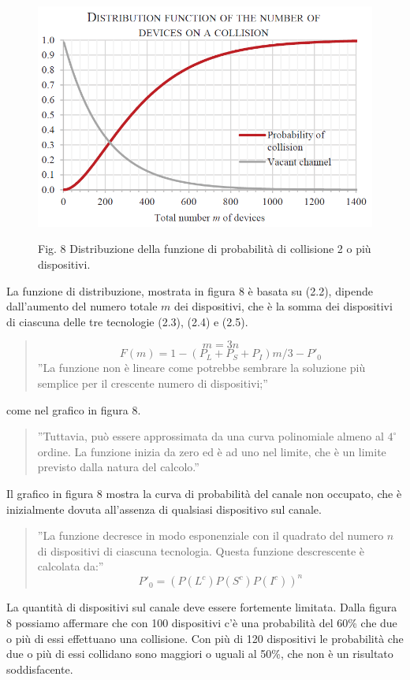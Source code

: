 \documentclass[a4paper]{report} %
\begin{document}
\begin{figure}
	\centering
	\includegraphics[scale=.5]{Immagini/DistribuzioneDiProb.png}
	
	Fig. 8 Distribuzione della funzione di probabilità di collisione 2 o più dispositivi.
\end{figure}

La funzione di distribuzione, mostrata in figura 8 è basata su (2.2), dipende dall'aumento del numero totale $m$ dei dispositivi, che è la somma dei dispositivi di ciascuna delle tre tecnologie (2.3), (2.4) e (2.5).
\begin{quote}
	\begin{equation}
	m = 3n 
	\end{equation}
	\begin{equation}
	F(m) = 1 - (P_L+P_S+P_I)m/3 - P'_0 
	\end{equation}
	''La funzione non è lineare come potrebbe sembrare la soluzione più semplice per il crescente numero di dispositivi;''
\end{quote}
come nel grafico in figura 8. 
\begin{quote}
	''Tuttavia, può essere approssimata da una curva polinomiale almeno al $4^{\circ}$ ordine. La funzione inizia da zero ed è ad uno nel limite, che è un limite previsto dalla natura del calcolo.'' 
\end{quote}
Il grafico in figura 8 mostra la curva di probabilità del canale non occupato, che è inizialmente dovuta all'assenza di qualsiasi dispositivo sul canale. 
\begin{quote}
	''La funzione decresce in modo esponenziale con il quadrato del numero $n$ di dispositivi di ciascuna tecnologia. Questa funzione descrescente è calcolata da:''
	\begin{equation}
	P'_0 = (P(L^c)P(S^c)P(I^c))^n 
	\end{equation}
\end{quote}
La quantità di dispositivi sul canale deve essere fortemente limitata. Dalla figura 8 possiamo affermare che con 100 dispositivi c'è una probabilità del 60\% che due o più di essi effettuano una collisione. Con più di 120 dispositivi le probabilità che due o più di essi collidano sono maggiori o uguali al 50\%, che non è un risultato soddisfacente.
\end{document}
